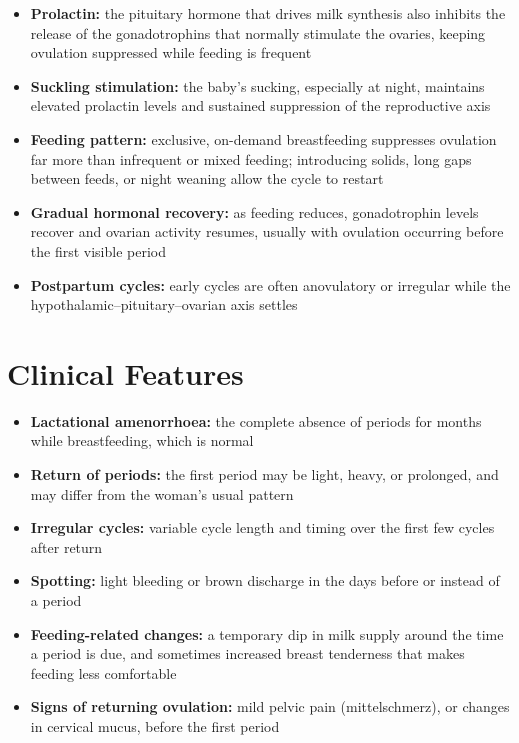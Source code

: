 \begin{itemize}
    \item \textbf{Prolactin:} the pituitary hormone that drives milk synthesis also inhibits the release of the gonadotrophins that normally stimulate the ovaries, keeping ovulation suppressed while feeding is frequent
    \item \textbf{Suckling stimulation:} the baby's sucking, especially at night, maintains elevated prolactin levels and sustained suppression of the reproductive axis
    \item \textbf{Feeding pattern:} exclusive, on-demand breastfeeding suppresses ovulation far more than infrequent or mixed feeding; introducing solids, long gaps between feeds, or night weaning allow the cycle to restart
    \item \textbf{Gradual hormonal recovery:} as feeding reduces, gonadotrophin levels recover and ovarian activity resumes, usually with ovulation occurring before the first visible period
    \item \textbf{Postpartum cycles:} early cycles are often anovulatory or irregular while the hypothalamic--pituitary--ovarian axis settles
\end{itemize}

\section*{Clinical Features}
\begin{itemize}
    \item \textbf{Lactational amenorrhoea:} the complete absence of periods for months while breastfeeding, which is normal
    \item \textbf{Return of periods:} the first period may be light, heavy, or prolonged, and may differ from the woman's usual pattern
    \item \textbf{Irregular cycles:} variable cycle length and timing over the first few cycles after return
    \item \textbf{Spotting:} light bleeding or brown discharge in the days before or instead of a period
    \item \textbf{Feeding-related changes:} a temporary dip in milk supply around the time a period is due, and sometimes increased breast tenderness that makes feeding less comfortable
    \item \textbf{Signs of returning ovulation:} mild pelvic pain (mittelschmerz), or changes in cervical mucus, before the first period
\end{itemize}

